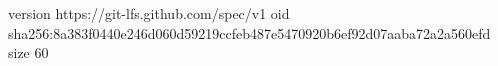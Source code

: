 version https://git-lfs.github.com/spec/v1
oid sha256:8a383f0440e246d060d59219ccfeb487e5470920b6ef92d07aaba72a2a560efd
size 60
